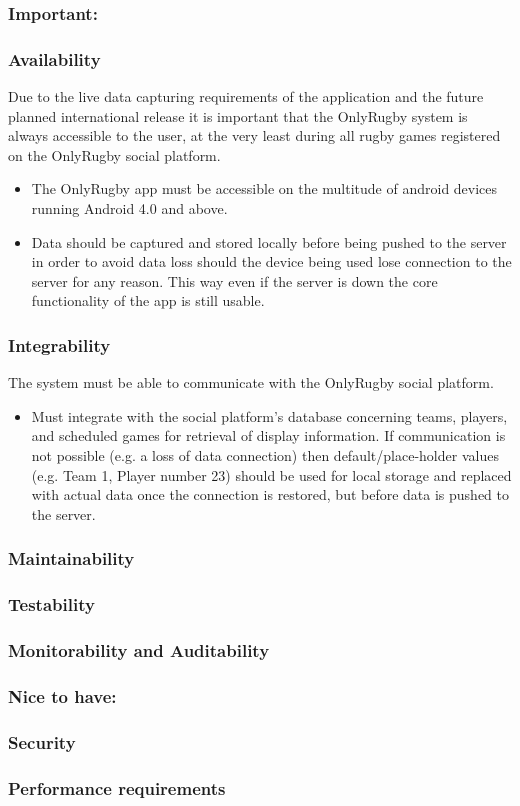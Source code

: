 	\subsubsection{Important:}

	\subsubsection*{Availability}
	Due to the live data capturing requirements of the application and the future planned international release it is important that the OnlyRugby system is always accessible to the user, at the very least during all rugby games registered on the OnlyRugby social platform.
	\begin{itemize}
		\item The OnlyRugby app must be accessible on the multitude of android devices running Android 4.0 and above.
		\item Data should be captured and stored locally before being pushed to the server in order to avoid data loss should the device being used lose connection to the server for any reason. This way even if the server is down the core functionality of the app is still usable.
	\end{itemize}

	\subsubsection*{Integrability}
	The system must be able to communicate with the OnlyRugby social platform.
	\begin{itemize}
		\item Must integrate with the social platform's database concerning teams, players, and scheduled games for retrieval of display information. If communication is not possible (e.g. a loss of data connection) then default/place-holder values (e.g. Team 1, Player number 23) should be used for local storage and replaced with actual data once the connection is restored, but before data is pushed to the server.
	\end{itemize}
	\subsubsection*{Maintainability}
	
	
	\subsubsection*{Testability}
	
	\subsubsection*{Monitorability and Auditability}

	\subsubsection{Nice to have:}
	
	\subsubsection*{Security}		
	
	\subsubsection*{Performance requirements}	
